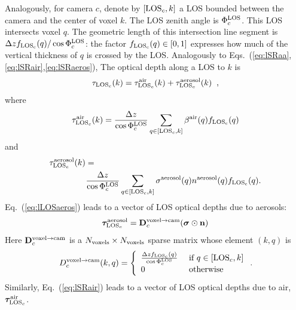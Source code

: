 \documentclass[10pt,twocolumn,letterpaper]{article}
\newcommand{\vect}[1]{\bm{#1}}
\begin{document}
Analogously, for camera $c$, denote by $[{\rm LOS}_c,k]$ a LOS bounded
between the camera and the center of voxel $k$. The LOS zenith angle
is $\Phi^{\rm LOS}_c$.  This LOS intersects voxel $q$. The geometric
length of this intersection line segment is $\Delta z f_{\rm
  LOS_c}(q)/\cos\Phi^{\rm LOS}_c$: the factor $f_{\rm LOS_c}(q)\in
[0,1]$ expresses how much of the vertical thickness of $q$ is crossed
by the LOS.  Analogously to
Eqs.~(\ref{eq:lSRaa},\ref{eq:lSRair},\ref{eq:lSRaeros}), The optical
depth %
along a LOS to $k$ is
\begin{equation}
  \tau_{{\rm LOS}_c}(k)=
  \tau_{{\rm LOS}_c}^{\rm air}(k) +  \tau_{{\rm LOS}_c}^{\rm aerosol}(k)
  \;\;,
  \label{eq:lLOSaerot}
\end{equation}
where
\begin{equation}
  \tau_{{\rm LOS}_c}^{\rm air}(k)=\frac{\Delta z}{\cos\Phi^{\rm LOS}_c}
  \sum_{q \in[{\rm LOS}_c,k]}
  \beta^{\rm air}(q)  f_{\rm LOS_c}(q)
  \label{eq:lLOSair}
\end{equation}
and
\begin{align}
  \label{eq:lLOSaeros}
  \tau_{{\rm LOS}_c}^{\rm aerosol}(k)=
  ~~~~~~~~~~~~~~~~~~~~~~~~~~~~~~~~~~~~~ ~~~~~~~~~~~~~~~~~~%
  ~~~~~
  \\
  \frac{\Delta z}{\cos\Phi^{\rm LOS}_c} \sum_{q \in[{\rm LOS}_c,k]}
  \sigma^{\rm aerosol}(q) n^{\rm aerosol}(q) f_{\rm LOS_c}(q).
  \nonumber
\end{align}
Eq.~(\ref{eq:lLOSaeros}) leads to a vector of LOS optical depths due
to aerosols:
\begin{equation}
  \vect{\tau}_{{\rm LOS}_c}^{\rm aerosol}=
  {\bf D}^{\mathrm{voxel \rightarrow cam}}_c
  (\vect{\sigma} \odot {\bf n})
  \label{eq:tauLOSvec1}
\end{equation}
Here ${\bf D}^{\mathrm{voxel \rightarrow cam}}_c$ is a $N_{\rm
  voxels}\times N_{\rm voxels}$ sparse matrix whose element $(k,q)$ is
\begin{equation}
  D^{\mathrm{voxel \rightarrow cam}}_c(k,q) =
  \left\{
    \begin{array}{ll}
      \frac{\Delta z f_{\rm LOS_c}(q)}{\cos\Phi^{\rm LOS}_c}
      & \mbox{ if $q \in[{\rm LOS}_c,k]$} \\
      0  & \mbox{ otherwise}
      \label{eq:Dvc}
    \end{array}
  \right.
  .
  \hspace{-0.05cm}
\end{equation}
Similarly, Eq.~(\ref{eq:lSRair}) leads to a vector of LOS optical
depths due to air, $\vect{\tau}_{{\rm LOS}_c}^{\rm air}$.
\end{document}
